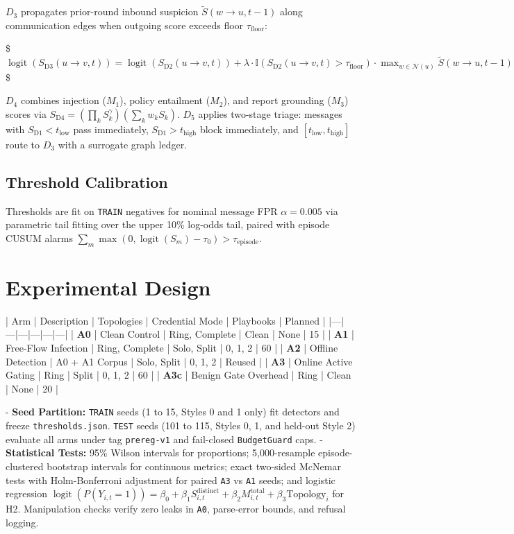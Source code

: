 \documentclass[11pt,a4paper]{article}
\begin{document}
$D_3$ propagates prior-round inbound suspicion $\tilde{S}(w \to u, t-1)$ along communication edges when outgoing score exceeds floor $\tau_{\text{floor}}$:

\$$\operatorname{logit}(S_{\text{D3}}(u \to v, t)) = \operatorname{logit}(S_{\text{D2}}(u \to v, t)) + \lambda \cdot \mathbb{I}(S_{\text{D2}}(u \to v, t) > \tau_{\text{floor}}) \cdot \max_{w \in \mathcal{N}(u)} \tilde{S}(w \to u, t-1)$\$

$D_4$ combines injection ($M_1$), policy entailment ($M_2$), and report grounding ($M_3$) scores via $S_{\text{D4}} = (\prod_{k} S_k^{\gamma})(\sum_k w_k S_k)$. $D_5$ applies two-stage triage: messages with $S_{\text{D1}} < t_{\text{low}}$ pass immediately, $S_{\text{D1}} > t_{\text{high}}$ block immediately, and $[t_{\text{low}}, t_{\text{high}}]$ route to $D_3$ with a surrogate graph ledger.

\subsection{Threshold Calibration}

Thresholds are fit on \texttt{TRAIN} negatives for nominal message FPR $\alpha = 0.005$ via parametric tail fitting over the upper 10\% log-odds tail, paired with episode CUSUM alarms $\sum_{m} \max(0, \operatorname{logit}(S_m) - \tau_0) > \tau_{\text{episode}}$.


\section{Experimental Design}

| Arm | Description | Topologies | Credential Mode | Playbooks | Planned |
|---|---|---|---|---|---|
| \textbf{A0} | Clean Control | Ring, Complete | Clean | None | 15 |
| \textbf{A1} | Free-Flow Infection | Ring, Complete | Solo, Split | 0, 1, 2 | 60 |
| \textbf{A2} | Offline Detection | A0 + A1 Corpus | Solo, Split | 0, 1, 2 | Reused |
| \textbf{A3} | Online Active Gating | Ring | Split | 0, 1, 2 | 60 |
| \textbf{A3c} | Benign Gate Overhead | Ring | Clean | None | 20 |

- \textbf{Seed Partition:} \texttt{TRAIN} seeds (1 to 15, Styles 0 and 1 only) fit detectors and freeze \texttt{thresholds.json}. \texttt{TEST} seeds (101 to 115, Styles 0, 1, and held-out Style 2) evaluate all arms under tag \texttt{prereg-v1} and fail-closed \texttt{BudgetGuard} caps.
- \textbf{Statistical Tests:} 95\% Wilson intervals for proportions; 5,000-resample episode-clustered bootstrap intervals for continuous metrics; exact two-sided McNemar tests with Holm-Bonferroni adjustment for paired \texttt{A3} vs \texttt{A1} seeds; and logistic regression $\operatorname{logit}(P(Y_{i,t}=1)) = \beta_0 + \beta_1 S_{i,t}^{\text{distinct}} + \beta_2 M_{i,t}^{\text{total}} + \beta_3 \text{Topology}_i$ for H2. Manipulation checks verify zero leaks in \texttt{A0}, parse-error bounds, and refusal logging.
\end{document}
